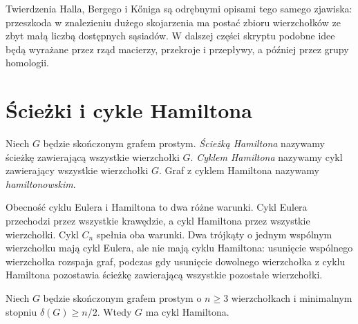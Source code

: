 \begin{uwaga}
Twierdzenia Halla, Bergego i Kőniga są odrębnymi opisami
tego samego zjawiska: przeszkoda w znalezieniu dużego
skojarzenia ma postać zbioru wierzchołków ze zbyt małą
liczbą dostępnych sąsiadów. W dalszej części skryptu
podobne idee będą wyrażane przez rząd macierzy,
przekroje i przepływy, a później przez grupy homologii.
\end{uwaga}

\section{Ścieżki i cykle Hamiltona}
\label{sec:tg-hamilton}

\begin{definicja}[Hamiltonowskość]
Niech $G$ będzie skończonym grafem prostym.
\emph{Ścieżką Hamiltona} nazywamy ścieżkę zawierającą
wszystkie wierzchołki $G$. \emph{Cyklem Hamiltona}
nazywamy cykl zawierający wszystkie wierzchołki $G$.
Graf z cyklem Hamiltona nazywamy \emph{hamiltonowskim}.
\end{definicja}

Obecność cyklu Eulera i Hamiltona to dwa różne warunki.
Cykl Eulera przechodzi przez wszystkie krawędzie,
a cykl Hamiltona przez wszystkie wierzchołki.
Cykl $C_n$ spełnia oba warunki. Dwa trójkąty o jednym
wspólnym wierzchołku mają cykl Eulera, ale nie mają
cyklu Hamiltona: usunięcie wspólnego wierzchołka
rozspaja graf, podczas gdy usunięcie dowolnego
wierzchołka z cyklu Hamiltona pozostawia ścieżkę
zawierającą wszystkie pozostałe wierzchołki.

\begin{center}
\end{center}

\begin{twierdzenie}[Dirac]
\label{thm:tg-dirac}
Niech $G$ będzie skończonym grafem prostym o
$n\ge3$ wierzchołkach i minimalnym stopniu
$\delta(G)\ge n/2$. Wtedy $G$ ma cykl Hamiltona.
\end{twierdzenie}

